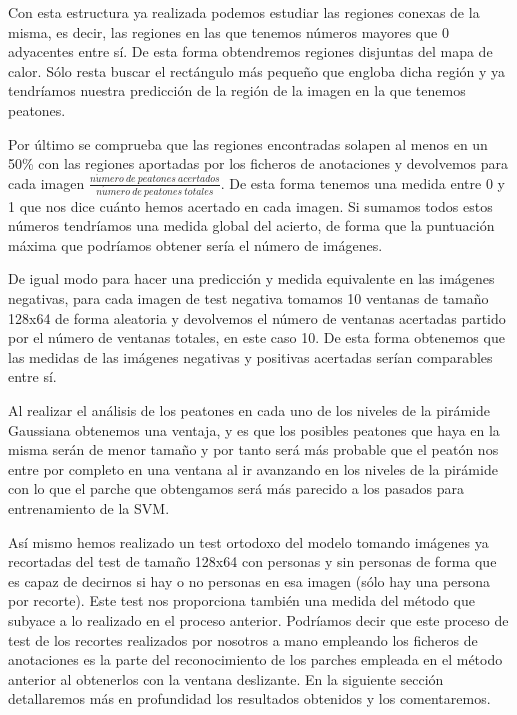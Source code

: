 \documentclass[a4paper,12pt]{article}
\begin{document}
Con esta estructura ya realizada podemos estudiar las regiones conexas de la misma, es decir, las regiones en las que tenemos números mayores que 0 adyacentes entre sí. De esta forma obtendremos regiones disjuntas del mapa de calor. Sólo resta buscar el rectángulo más pequeño que engloba dicha región y ya tendríamos nuestra predicción de la región de la imagen en la que tenemos peatones. 

Por último se comprueba que las regiones encontradas solapen al menos en un 50\% con las regiones aportadas por los ficheros de anotaciones y devolvemos para cada imagen $\frac{n\acute{u}mero \ de \ peatones \ acertados}{n\acute{u}mero \ de \ peatones \ totales}$. De esta forma tenemos una medida entre 0 y 1 que nos dice cuánto hemos acertado en cada imagen. Si sumamos todos estos números tendríamos una medida global del acierto, de forma que la puntuación máxima que podríamos obtener sería el número de imágenes. 

De igual modo para hacer una predicción y medida equivalente en las imágenes negativas, para cada imagen de test negativa tomamos 10 ventanas de tamaño 128x64 de forma aleatoria y devolvemos el número de ventanas acertadas partido por el número de ventanas totales, en este caso 10. De esta forma obtenemos que las medidas de las imágenes negativas y positivas acertadas serían comparables entre sí. 

Al realizar el análisis de los peatones en cada uno de los niveles de la pirámide Gaussiana obtenemos una ventaja, y es que los posibles peatones que haya en la misma serán de menor tamaño y por tanto será más probable que el peatón nos entre por completo en una ventana al ir avanzando en los niveles de la pirámide con lo que el parche que obtengamos será más parecido a los pasados para entrenamiento de la SVM. 

Así mismo hemos realizado un test ortodoxo del modelo tomando imágenes ya recortadas del test de tamaño 128x64 con personas y sin personas de forma que es capaz de decirnos si hay o no personas en esa imagen (sólo hay una persona por recorte). Este test nos proporciona también una medida del método que subyace a lo realizado en el proceso anterior. Podríamos decir que este proceso de test de los recortes realizados por nosotros a mano empleando los ficheros de anotaciones es la parte del reconocimiento de los parches empleada en el método anterior al obtenerlos con la ventana deslizante. En la siguiente sección detallaremos más en profundidad los resultados obtenidos y los comentaremos.
\end{document}
